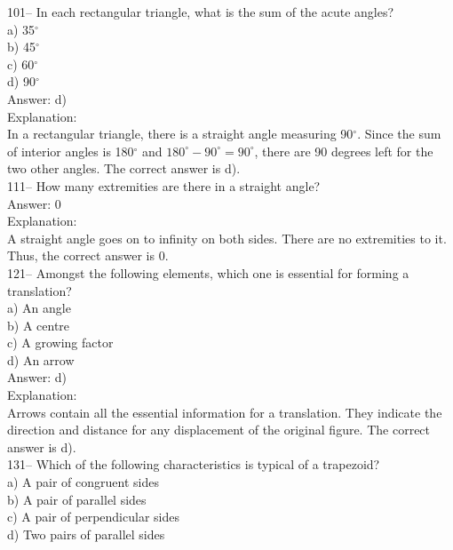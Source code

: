 \documentclass[letterpaper, 12pt]{article}
\begin{document}
101-- In each rectangular triangle, what is the sum of the acute angles?\\
a) 35$^{\circ}$\\
b) 45$^{\circ}$\\
c) 60$^{\circ}$\\
d) 90$^{\circ}$\\

Answer: d)\\

Explanation:\\
In a rectangular triangle, there is a straight angle measuring 90$^{\circ}$. Since the sum of interior angles is 180$^{\circ}$ and $180^{\circ}-90^{\circ} = 90^{\circ}$, there are 90 degrees left for the two other angles. The correct answer is d).\\

111-- How many extremities are there in a straight angle?\\

Answer: 0\\

Explanation: \\
A straight angle goes on to infinity on both sides. There are no extremities to it.  Thus, the correct answer is 0.\\


121-- Amongst the following elements, which one is essential for forming a translation?\\
a) An angle\\
b) A centre\\
c) A growing factor\\
d) An arrow\\

Answer: d)\\

Explanation:\\
Arrows contain all the essential information for a translation. They indicate the direction and distance for any displacement of the original figure. The correct answer is d).\\



131-- Which of the following characteristics is typical of a trapezoid?\\

a) A pair of congruent sides\\
b) A pair of parallel sides\\
c) A pair of perpendicular sides\\
d) Two pairs of parallel sides\\
\end{document}
